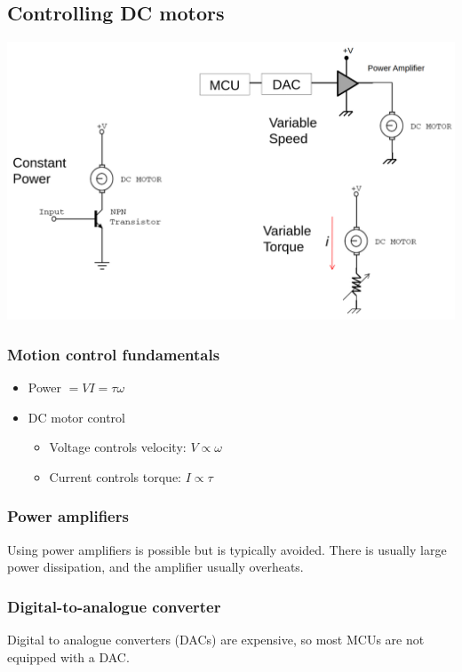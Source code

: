 \documentclass[11pt]{article}
\begin{document}
\subsection{Controlling DC motors}
\label{sec:org2945844}
\begin{center}
\includegraphics[width=.9\linewidth]{./images/controlling-dc-motors.png}
\end{center}

\subsubsection{Motion control fundamentals}
\label{sec:org27b773e}
\begin{itemize}
\item Power \(= VI = \tau \omega\)
\item DC motor control
\begin{itemize}
\item Voltage controls velocity: \(V \propto \omega\)
\item Current controls torque: \(I \propto \tau\)
\end{itemize}
\end{itemize}

\subsubsection{Power amplifiers}
\label{sec:org47d20c1}
Using power amplifiers is possible but is typically avoided. There is usually large power dissipation, and the amplifier usually overheats.

\subsubsection{Digital-to-analogue converter}
\label{sec:org2ef9aa1}
Digital to analogue converters (DACs) are expensive, so most MCUs are not equipped with a DAC.
\end{document}
